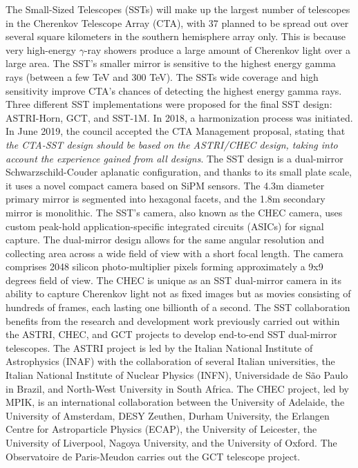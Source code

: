 The Small-Sized Telescopes (SSTs) will make up the largest number of telescopes in the Cherenkov Telescope Array (CTA), with 37 planned to be spread out over several square kilometers in the southern hemisphere array only. This is because very high-energy $\gamma$-ray showers produce a large amount of Cherenkov light over a large area. The SST's smaller mirror is sensitive to the highest energy gamma rays (between a few TeV and 300 TeV). The SSTs wide coverage and high sensitivity improve CTA's chances of detecting the highest energy gamma rays. Three different SST implementations were proposed for the final SST design: ASTRI-Horn, GCT, and SST-1M. In 2018, a harmonization process was initiated. In June 2019, the council accepted the CTA Management proposal, stating that \textit{the CTA-SST design should be based on the ASTRI/CHEC design, taking into account the experience gained from all designs}. The SST design is a dual-mirror Schwarzschild-Couder aplanatic configuration, and thanks to its small plate scale, it uses a novel compact camera based on SiPM sensors. The 4.3m diameter primary mirror is segmented into hexagonal facets, and the 1.8m secondary mirror is monolithic. The SST's camera, also known as the CHEC camera, uses custom peak-hold application-specific integrated circuits (ASICs) for signal capture. The dual-mirror design allows for the same angular resolution and collecting area across a wide field of view with a short focal length. The camera comprises 2048 silicon photo-multiplier pixels forming approximately a 9x9 degrees field of view. The CHEC is unique as an SST dual-mirror camera in its ability to capture Cherenkov light not as fixed images but as movies consisting of hundreds of frames, each lasting one billionth of a second. The SST collaboration benefits from the research and development work previously carried out within the ASTRI, CHEC, and GCT projects to develop end-to-end SST dual-mirror telescopes. The ASTRI project is led by the Italian National Institute of Astrophysics (INAF) with the collaboration of several Italian universities, the Italian National Institute of Nuclear Physics (INFN), Universidade de São Paulo in Brazil, and North-West University in South Africa. The CHEC project, led by MPIK, is an international collaboration between the University of Adelaide, the University of Amsterdam, DESY Zeuthen, Durham University, the Erlangen Centre for Astroparticle Physics (ECAP), the University of Leicester, the University of Liverpool, Nagoya University, and the University of Oxford. The Observatoire de Paris-Meudon carries out the GCT telescope project.


